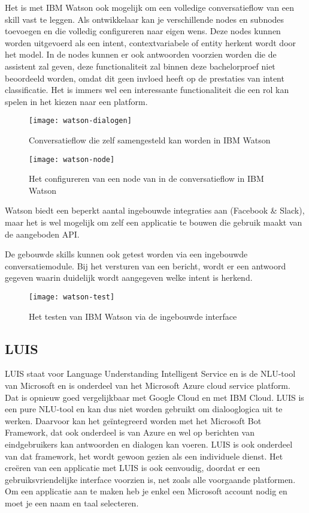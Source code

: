 Het is met IBM Watson ook mogelijk om een volledige conversatieflow van een skill vast te leggen. Als ontwikkelaar kan je verschillende nodes en subnodes toevoegen en die volledig configureren naar eigen wens. Deze nodes kunnen worden uitgevoerd als een intent, contextvariabele of entity herkent wordt door het model. In de nodes kunnen er ook antwoorden voorzien worden die de assistent zal geven, deze functionaliteit zal binnen deze bachelorproef niet beoordeeld worden, omdat dit geen invloed heeft op de prestaties van intent classificatie. Het is immers wel een interessante functionaliteit die een rol kan spelen in het kiezen naar een platform.

\begin{figure}[H]
    \label{fig:watson-dialogen}
    \centering
    \texttt{[image: watson-dialogen]}
    \caption{Conversatieflow die zelf samengesteld kan worden in IBM Watson}
\end{figure}

\begin{figure}[H]
    \label{fig:watson-node}
    \centering
    \texttt{[image: watson-node]}
    \caption{Het configureren van een node van in de conversatieflow in IBM Watson}
\end{figure}

Watson biedt een beperkt aantal ingebouwde integraties aan (Facebook \& Slack), maar het is wel mogelijk om zelf een applicatie te bouwen die gebruik maakt van de aangeboden API.

De gebouwde skills kunnen ook getest worden via een ingebouwde conversatiemodule. Bij het versturen van een bericht, wordt er een antwoord gegeven waarin duidelijk wordt aangegeven welke intent is herkend.

\begin{figure}[H]
    \label{fig:watson-test}
    \centering
    \texttt{[image: watson-test]}
    \caption{Het testen van IBM Watson via de ingebouwde interface}
\end{figure}

\subsection{LUIS}
\label{subsec:werking-platformen-luis}

LUIS staat voor Language Understanding Intelligent Service en is de NLU-tool van Microsoft en is onderdeel van het Microsoft Azure cloud service platform. Dat is opnieuw goed vergelijkbaar met Google Cloud en met IBM Cloud. LUIS is een pure NLU-tool en kan dus niet worden gebruikt om dialooglogica uit te werken. Daarvoor kan het geïntegreerd worden met het Microsoft Bot Framework, dat ook onderdeel is van Azure en wel op berichten van eindgebruikers kan antwoorden en dialogen kan voeren. LUIS is ook onderdeel van dat framework, het wordt gewoon gezien als een individuele dienst. Het creëren van een applicatie met LUIS is ook eenvoudig, doordat er een gebruiksvriendelijke interface voorzien is, net zoals alle voorgaande platformen. Om een applicatie aan te maken heb je enkel een Microsoft account nodig en moet je een naam en taal selecteren.

